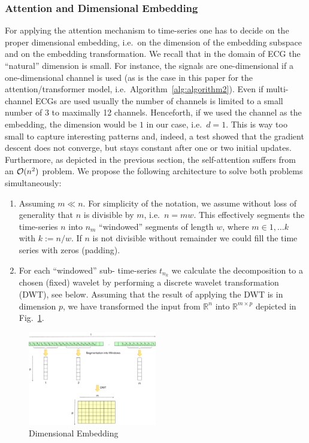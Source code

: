 \documentclass{ieeeaccess}
\begin{document}
\subsubsection{Attention and Dimensional Embedding}
For applying the attention mechanism to time-series one has to decide on the proper dimensional embedding, i.e.\ on the dimension of the embedding subspace and on the embedding transformation. We recall that in the domain of ECG the ``natural'' dimension is small. For instance, the signals are one-dimensional if a one-dimensional channel is used (as is the case in this paper for the attention/transformer model, i.e.\ Algorithm~\ref{alg:algorithm2}). Even if multi-channel ECGs are used usually the number of channels is limited to a small number of 3 to maximally 12 channels. Henceforth, if we used the channel as the embedding, the dimension would be $1$ in our case, i.e.\ $d=1$. This is way too small to capture interesting patterns and, indeed, a test showed that the gradient descent does not converge, but stays constant after one or two initial updates. Furthermore, as depicted in the previous section, the self-attention suffers from an  ${\cal O}(n^2)$ problem. We propose the following architecture to solve both problems simultaneously:
\begin{enumerate}
\item Assuming $m \ll n$. For simplicity of the notation, we assume without loss of generality that $n$ is divisible by $m$, i.e.\ $n = mw$. This effectively segments the time-series $n$ into $n_m$  ``windowed'' segments of length $w$, where $m\in 1, \ldots k$ with $k:=n/w$. If $n$ is not divisible without remainder we could fill the time series with zeros (padding).
\item For each ``windowed'' sub- time-series $t_{n_k}$ we calculate the decomposition to a chosen (fixed) wavelet by performing a discrete wavelet transformation (DWT), see below. Assuming that the result of applying the DWT is in dimension $p$, we have transformed the input from $\mathbb{R}^{n}$ into $\mathbb{R}^{m\times p}$ depicted in Fig.~\ref{fig:dimEmbedding}.
\end{enumerate}

\begin{figure}[!ht]
\includegraphics[width=0.5\textwidth]{Images/DimEmbedding}
\caption{Dimensional Embedding\label{fig:dimEmbedding}}
\end{figure}   
\end{document}
